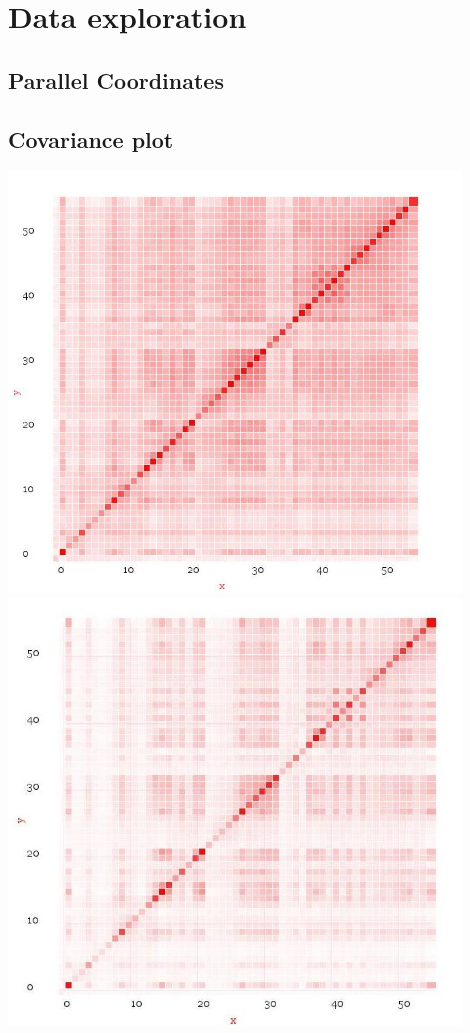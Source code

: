 \documentclass[10pt]{article}
\begin{document}
\newpage
\section{Data exploration}
\subsection{Parallel Coordinates}
\subsection{Covariance plot}
\includegraphics[width=120mm]{ReportMedia/CovariancePre.jpg}\\
\includegraphics[width=120mm]{ReportMedia/CovariancePost.jpg}
\end{document}
